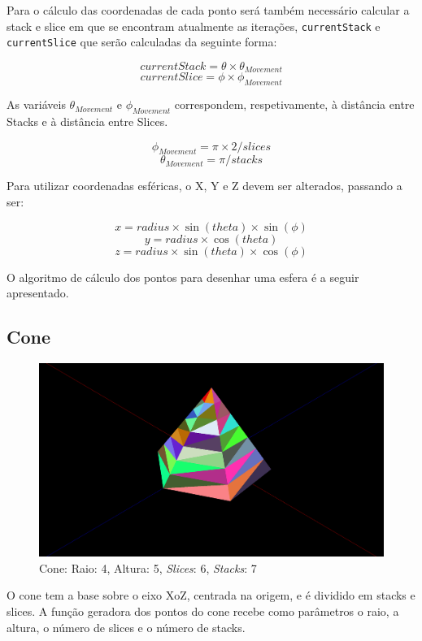 \documentclass[a4paper]{article}
\begin{document}
Para o cálculo das coordenadas de cada ponto será também necessário calcular a stack e slice em que se encontram atualmente as iterações, \texttt{currentStack} e \texttt{currentSlice} que serão calculadas da seguinte forma:

\[currentStack = \theta \times \theta_{Movement}\]
\[currentSlice = \phi \times \phi_{Movement}\]


As variáveis $\theta_{Movement}$ e $\phi_{Movement}$ correspondem, respetivamente, à distância entre Stacks e à distância entre Slices.

\[\phi_{Movement} = \pi \times 2 / slices\]
\[\theta_{Movement} = \pi / stacks\]


Para utilizar coordenadas esféricas, o X, Y e Z devem ser alterados, passando a ser:

\[x = radius \times \sin(theta) \times \sin(\phi)\]
\[y = radius \times \cos(theta)\]
\[z = radius \times \sin(theta) \times \cos(\phi)\]

O algoritmo de cálculo dos pontos para desenhar uma esfera é a seguir apresentado.


\subsection{Cone}

\begin{figure}[H]
    \centering
    \includegraphics[width=\textwidth]{cone.png}
    \caption{Cone: Raio: 4, Altura: 5, \textit{Slices}: 6, \textit{Stacks}: 7}
\end{figure}

O cone tem a base sobre o eixo XoZ, centrada na origem, e é dividido em stacks e slices. A função geradora dos pontos do cone recebe como parâmetros o raio, a altura, o número de slices e o número de stacks.
\end{document}
